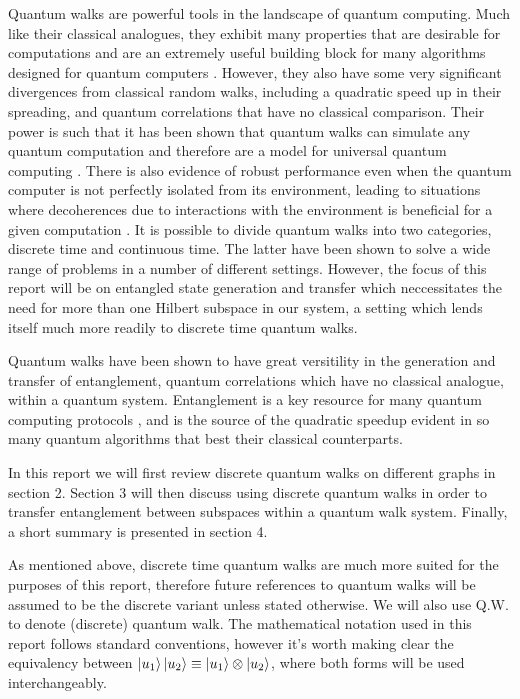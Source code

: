 Quantum walks are powerful tools in the landscape of quantum computing. 
Much like their classical analogues, they exhibit many properties that are desirable for computations and are an extremely useful building block for many algorithms designed for quantum computers \cite{shenvi2003}. 
However, they also have some very significant divergences from classical random walks, including a quadratic speed up in their spreading, and quantum correlations that have no classical comparison. 
Their power is such that it has been shown that quantum walks can simulate any quantum computation and therefore are a model for universal quantum computing \cite{Childs_2009}.
There is also evidence of robust performance even when the quantum computer is not perfectly isolated from its environment, leading to situations where decoherences due to interactions with the environment is beneficial for a given computation \cite{KENDON_2007}. 
It is possible to divide quantum walks into two categories, discrete time and continuous time. 
The latter have been shown to solve a wide range of problems in a number of different settings. 
However, the focus of this report will be on entangled state generation and transfer which neccessitates the need for more than one Hilbert subspace in our system, a setting which lends itself much more readily to discrete time quantum walks.\newline

Quantum walks have been shown to have great versitility in the generation and transfer of entanglement, quantum correlations which have no classical analogue, within a quantum system. 
Entanglement is a key resource for many quantum computing protocols \cite{qkd}\cite{Superdense}\cite{qteleport}, and is the source of the quadratic speedup evident in so many quantum algorithms that best their classical counterparts.\newline

In this report we will first review discrete quantum walks on different graphs in section 2. 
Section 3 will then discuss using discrete quantum walks in order to transfer entanglement between subspaces within a quantum walk system. 
Finally, a short summary is presented in section 4.\newline

As mentioned above, discrete time quantum walks are much more suited for the purposes of this report, therefore future references to quantum walks will be assumed to be the discrete variant unless stated otherwise. 
We will also use Q.W. to denote (discrete) quantum walk. 
The mathematical notation used in this report follows standard conventions, however it's worth making clear the equivalency between $\ket{u_1}\ket{u_2} \equiv \ket{u_1} \otimes \ket{u_2}$, where both forms will be used interchangeably.